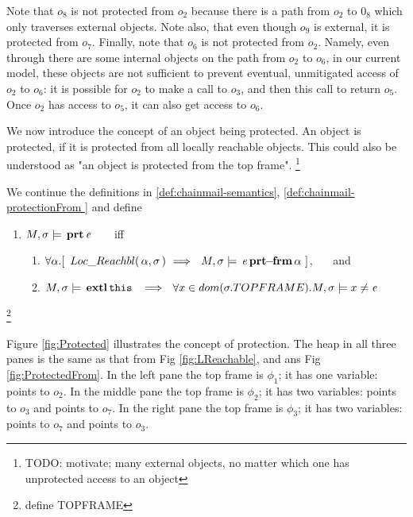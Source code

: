  

Note that $o_8$ is not protected from $o_2$ because there is a path from $o_2$ to $0_8$ which only traverses external objects. Note also, that even though $o_9$ is external, it is protected from $o_7$.
Finally, note that $o_6$ is not protected from $o_2$. 
Namely, even through there are some internal objects on the path from $o_2$ to $o_6$, in our current model, these objects are not sufficient to prevent eventual, unmitigated access of $o_2$ to $o_6$: it is possible for $o_2$ to make a call to $o_3$, and then this call to return $o_5$. Once $o_2$ has access to $o_5$, it can also get access to $o_6$. 


\vspace{.1in}

We now introduce the concept of an object being protected.
An object is protected, if it is protected from all locally reachable objects. This could also be understood as 
"an object is protected from the top frame". \footnote{TODO: motivate; many external objects, no matter which one has unprotected access to an object }
 
\begin{definition} 
\label{def:chainmail-protection}
We continue the definitions in \ref{def:chainmail-semantics}, \ref{def:chainmail-protectionFrom } and  define   
\begin{enumerate}
\item
$M , \sigma \models {\ensuremath{\, \mathbf{prt}}\, \mathit{e}\, }$  \ \ \ iff \ \ \ 
\begin{enumerate}
\item
{$\forall \alpha.[ \  \LRelevant {\alpha}  {\sigma}\ \Longrightarrow \ \  \satisfiesA{M}{\sigma}{\protectedFrom{\re} {{\alpha}}}\ ] $}, \ \ \ and 
\item
$\satisfiesA{M}{\sigma}{\external{\prg{this}}}\ \ \Longrightarrow\ \ \forall x\in dom(\sigma.TOPFRAME).\satisfiesA{M}{\sigma}{x\neq \re}$
\end{enumerate}
\end{enumerate}
\end{definition}\footnote{define TOPFRAME}
 
  Figure \ref{fig:Protected} illustrates the concept of protection. The heap in all three panes is the same as that from  Fig \ref{fig:LReachable}, and 
 ans Fig \ref{fig:ProtectedFrom}. In the left pane the top frame is $\phi_1$; it has  one variable:  points to $o_2$. In the middle pane the top frame is $\phi_2$; it has two  variables:   \prg{this} points to $o_3$ and  points to $o_7$. In the right pane  the top frame is $\phi_3$; it has two  variables:    points to $o_7$ and  points to $o_3$.  

